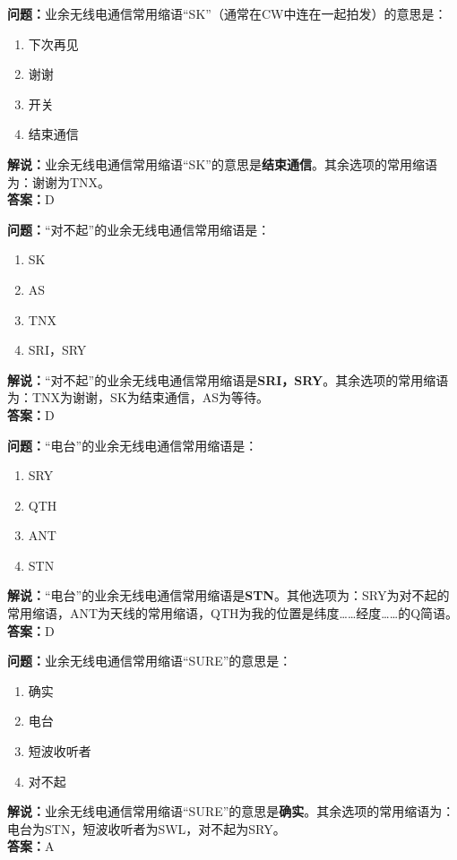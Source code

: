 \bigskip


\noindent\textbf{问题：}业余无线电通信常用缩语“SK”（通常在CW中连在一起拍发）的意思是：
\begin{enumerate}[label=\Alph*), leftmargin=3em]
\item 下次再见
\item 谢谢
\item 开关
\item 结束通信
\end{enumerate}
\noindent\textbf{解说：}业余无线电通信常用缩语“SK”的意思是\textbf{结束通信}。其余选项的常用缩语为：谢谢为TNX。\\\noindent\textbf{答案：}D




\bigskip


\noindent\textbf{问题：}“对不起”的业余无线电通信常用缩语是：
\begin{enumerate}[label=\Alph*), leftmargin=3em]
\item SK
\item AS
\item TNX
\item SRI，SRY
\end{enumerate}
\noindent\textbf{解说：}“对不起”的业余无线电通信常用缩语是\textbf{SRI，SRY}。其余选项的常用缩语为：TNX为谢谢，SK为结束通信，AS为等待。\\\noindent\textbf{答案：}D



\bigskip


\noindent\textbf{问题：}“电台”的业余无线电通信常用缩语是：
\begin{enumerate}[label=\Alph*), leftmargin=3em]
\item SRY
\item QTH
\item ANT
\item STN
\end{enumerate}
\noindent\textbf{解说：}“电台”的业余无线电通信常用缩语是\textbf{STN}。其他选项为：SRY为对不起的常用缩语，ANT为天线的常用缩语，QTH为我的位置是纬度……经度……的Q简语。\\\noindent\textbf{答案：}D



\bigskip


\noindent\textbf{问题：}业余无线电通信常用缩语“SURE”的意思是：
\begin{enumerate}[label=\Alph*), leftmargin=3em]
\item 确实
\item 电台
\item 短波收听者
\item 对不起
\end{enumerate}
\noindent\textbf{解说：}业余无线电通信常用缩语“SURE”的意思是\textbf{确实}。其余选项的常用缩语为：电台为STN，短波收听者为SWL，对不起为SRY。\\\noindent\textbf{答案：}A


